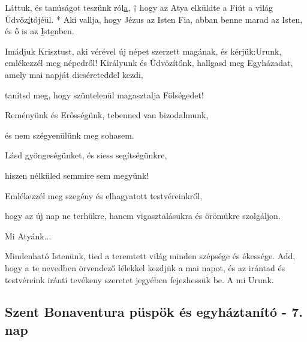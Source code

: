 \documentclass[twoside]{article}
\begin{document}
Láttuk, és tanúságot teszünk ról\underline{a}, † hogy az Atya elküldte a Fiút a világ Üdvöz\underline{í}tőjéül. * Aki vallja, hogy Jézus az Isten Fia, abban benne marad az Isten, és ő is az \underline{I}st\underline{e}nben.






\begin{preces}{Imádjuk Krisztust, aki vérével új népet szerzett magának, és kérjük:}{Urunk, emlékezzél meg népedről!}
  Királyunk és Üdvözítőnk, hallgasd meg Egyházadat, amely mai napját dicséreteddel kezdi,

  \reddash tanítsd meg, hogy szüntelenül magasztalja Fölségedet!

  Reményünk és Erősségünk, tebenned van bizodalmunk,

  \reddash és nem szégyenülünk meg sohasem.

  Lásd gyöngeségünket, és siess segítségünkre,

  \reddash hiszen nélküled semmire sem megyünk!

  Emlékezzél meg szegény és elhagyatott testvéreinkről,

  \reddash hogy az új nap ne terhükre, hanem vigasztalásukra és örömükre szolgáljon.
\end{preces}
Mi Atyánk...

Mindenható Istenünk, tied a teremtett világ minden szépsége és ékessége. Add, hogy a te nevedben örvendező lélekkel kezdjük a mai napot, és az irántad és testvéreink iránti tevékeny szeretet jegyében fejezhessük be. A mi Urunk.


\subsection*{Szent Bonaventura püspök és egyháztanító - 7. nap}

\begin{center}\end{center}

\end{document}
